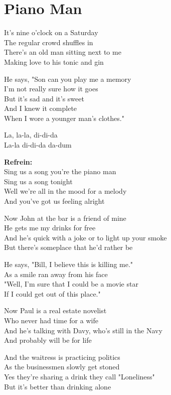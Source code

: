\section{Piano Man}
It's nine o'clock on a Saturday\\
The regular crowd shuffles in\\
There's an old man sitting next to me\\
Making love to his tonic and gin

He says, "Son can you play me a memory\\
I'm not really sure how it goes\\
But it's sad and it's sweet\\
And I knew it complete\\
When I wore a younger man's clothes."

La, la-la, di-di-da\\
La-la di-di-da da-dum

\textbf{Refrein:}\\
Sing us a song you're the piano man\\
Sing us a song tonight\\
Well we're all in the mood for a melody\\
And you've got us feeling alright

Now John at the bar is a friend of mine\\
He gets me my drinks for free\\
And he's quick with a joke or to light up your smoke\\
But there's someplace that he'd rather be

He says, "Bill, I believe this is killing me."\\
As a smile ran away from his face\\
"Well, I'm sure that I could be a movie star\\
If I could get out of this place."

Now Paul is a real estate novelist\\
Who never had time for a wife\\
And he's talking with Davy, who's still in the Navy\\
And probably will be for life

And the waitress is practicing politics\\
As the businessmen slowly get stoned\\
Yes they're sharing a drink they call "Loneliness"\\
But it's better than drinking alone

